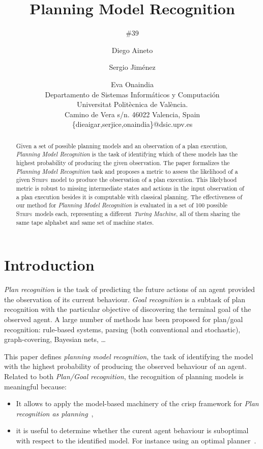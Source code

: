 \documentclass[letterpaper]{article} %
\newcommand{\strips}{\textsc{Strips}}     %
\begin{document}
\title{Planning Model Recognition}
\author{\#39}


\author{Diego Aineto\and Sergio Jim\'enez\and Eva Onaindia\\
{\small Departamento de Sistemas Inform\'aticos y Computaci\'on}\\
{\small Universitat Polit\`ecnica de Val\`encia.}\\
{\small Camino de Vera s/n. 46022 Valencia, Spain}\\
{\small \{dieaigar,serjice,onaindia\}@dsic.upv.es}}

\maketitle
\begin{abstract} 
Given a set of possible planning models and an observation of a plan execution, {\em Planning Model Recognition} is the task of identifying which of these models has the highest probability of producing the given observation. The paper formalizes the {\em Planning Model Recognition} task and proposes a metric to assess the likelihood of a given \strips\ model to produce the observation of a plan execution. This likelyhood metric is robust to missing intermediate states and actions in the input observation of a plan execution besides it is computable with classical planning. The effectiveness of our method for {\em Planning Model Recognition} is evaluated in a set of 100 possible \strips\ models each, representing a different {\em Turing Machine}, all of them sharing the same tape alphabet and same set of machine states.
\end{abstract}


\section{Introduction}
\label{sec:section1}
{\em Plan recognition} is the task of predicting the future actions of an agent provided the observation of its current behaviour. {\em Goal recognition} is a subtask of plan recognition with the particular objective of discovering the terminal goal of the observed agent. A large number of methods has been proposed for plan/goal recognition: rule-based systems,  parsing  (both  conventional and stochastic), graph-covering, Bayesian nets, \ldots 

This paper defines {\em planning model recognition}, the task of identifying the model with the highest probability of producing the observed behaviour of an agent. Related to both {\em Plan/Goal recognition}, the recognition of planning models is meaningful because:
\begin{itemize}
\item It allows to apply the model-based machinery of the crisp framework for {\em Plan recognition as planning}~\cite{ramirez2012plan,ramirez2009plan},
\item it is useful to determine whether the curent agent behaviour is suboptimal with respect to the identified model. For instance using an optimal planner~\cite{malte:optimalp:AAAI17}.  
\end{itemize}
\end{document}
